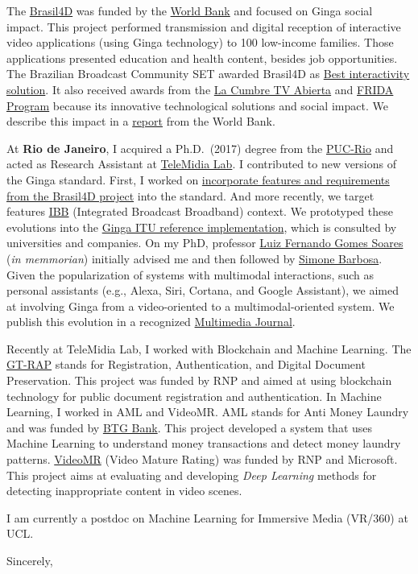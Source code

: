 \documentclass[10pt,a4paper,sans,colorlinks]{moderncv}
\begin{document}
The \href{http://www.ebc.com.br/brasil-4d}{Brasil4D} was funded by the \href{https://www.worldbank.org/}{World Bank} and focused on Ginga social impact.
This project performed transmission and digital reception of interactive video applications (using Ginga technology) to 100 low-income families.
Those applications presented education and health content, besides job opportunities.
The Brazilian Broadcast Community SET awarded Brasil4D as \href{http://set.org.br/artigos/ed137/137_revistadaset_70.pdf}{Best interactivity solution}.
It also received awards from the \href{https://www.premiotv.com/es/ganadores-es/ganadores-2013-es}{La Cumbre TV Abierta} and \href{https://programafrida.net/archivos/project/brasil-4d}{FRIDA Program} because its innovative technological solutions and social impact.
We describe this impact in a  \href{http://documents.worldbank.org/curated/en/232621468230956108/pdf/809560WP0PORTU0Box0379824B00PUBLIC0.pdf}{report} from the World Bank.

At \textbf{Rio de Janeiro}, I acquired a Ph.D.~(2017) degree from the \href{http://www.inf.puc-rio.br/}{PUC-Rio} and acted as Research Assistant at \href{http://telemidia.puc-rio.br/}{TeleMidia Lab}.
I contributed to new versions of the Ginga standard.
First, I worked on \href{https://www.abntcatalogo.com.br/norma.aspx?
  ID=361857#}{incorporate features and requirements from the Brasil4D project} into the standard.
And more recently, we target features \href{http://www.freepatentsonline.com/y2016/0234533.html}{IBB} (Integrated Broadcast Broadband) context.
We prototyped these evolutions into the  \href{https://github.com/TeleMidia/ginga}{Ginga ITU reference implementation}, which is consulted by universities and companies.
On my PhD, professor \href{https://www.researchgate.net/profile/Luiz_Fernando_Soares}{Luiz Fernando Gomes Soares} (\textit{in memmorian}) initially advised me and then followed by  \href{https://www.linkedin.com/in/simonedjb/}{Simone Barbosa}.
Given the popularization of systems with multimodal interactions, such as personal assistants (e.g., Alexa, Siri, Cortana, and Google Assistant), we aimed at involving Ginga from a video-oriented to a multimodal-oriented system.
We publish this evolution in a recognized \href{https://link.springer.com/article/10.1007\%2Fs11042-016-3846-8}{Multimedia Journal}.

Recently at TeleMidia Lab, I worked with Blockchain and Machine Learning.
The \href{http://wrnp.rnp.br/sites/wrnp2017/files/02_wrnp2017_poster_gt-sap_design.pdf}{GT-RAP} stands for Registration, Authentication, and Digital Document Preservation.
This project was funded by RNP and aimed at using blockchain technology for public document registration and authentication.
In Machine Learning, I worked in AML and VideoMR.
AML stands for Anti Money Laundry and was funded by \href{https://www.btgpactual.com/}{BTG
Bank}.
This project developed a system that uses Machine Learning to understand money transactions and detect money laundry patterns.
\href{https://www.rnp.br/en/rnp-and-microsoft-challenge-artificial-intelligence}{VideoMR} (Video Mature Rating) was funded by RNP and Microsoft.
This project aims at evaluating and developing \textit{Deep Learning} methods for detecting inappropriate content in video scenes.

I am currently a postdoc on Machine Learning for Immersive Media (VR/360) at UCL.

\vspace{1em}
\raggedright
Sincerely, \myname
\end{document}
